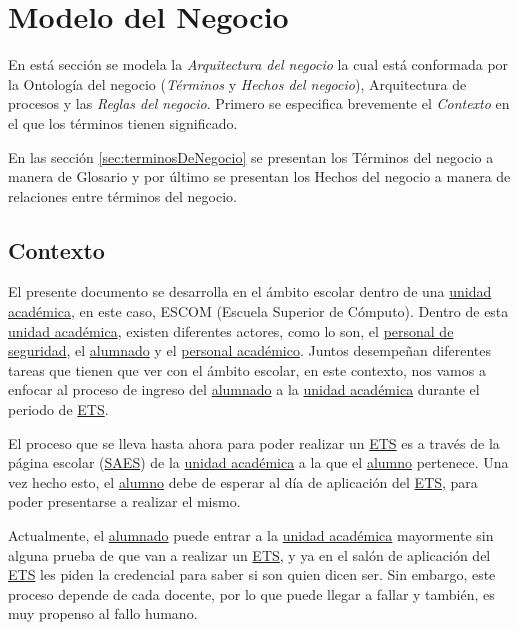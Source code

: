 \section{Modelo del Negocio}	
\label{cap:reqSist}

	En está sección se modela la {\em Arquitectura del negocio} la cual está conformada por la Ontología del negocio ({\em Términos} y {\em Hechos del negocio}), Arquitectura de procesos y las {\em Reglas del negocio}. Primero se especifica brevemente el {\em Contexto} en el que los términos tienen significado.
		
	En las sección \ref{sec:terminosDeNegocio} se presentan los Términos del negocio a manera de Glosario y por último se presentan los Hechos del negocio a manera de relaciones entre términos del negocio.


\subsection{Contexto}

	El presente documento se desarrolla en el ámbito escolar dentro de una \hyperlink{tUnidadAcademica}{unidad académica}, en este caso, ESCOM (Escuela Superior de Cómputo). Dentro de esta \hyperlink{tUnidadAcademica}{unidad académica}, existen diferentes actores, como lo son, el \hyperlink{tPersonalSeguridad}{personal de seguridad}, el \hyperlink{tAlumno}{alumnado} y el \hyperlink{tPersonalAcademico}{personal académico}. Juntos desempeñan diferentes tareas que tienen que ver con el ámbito escolar, en este contexto, nos vamos a enfocar al proceso de ingreso del \hyperlink{tAlumno}{alumnado} a la \hyperlink{tUnidadAcademica}{unidad académica} durante el periodo de \hyperlink{tETS}{ETS}.
	
	El proceso que se lleva hasta ahora para poder realizar un \hyperlink{tETS}{ETS} es a través de la página escolar (\hyperlink{tSAES}{SAES}) de la \hyperlink{tUnidadAcademica}{unidad académica} a la que el \hyperlink{tAlumno}{alumno} pertenece. Una vez hecho esto, el \hyperlink{tAlumno}{alumno} debe de esperar al día de aplicación del \hyperlink{tETS}{ETS}, para poder presentarse a realizar el mismo.
	
	Actualmente, el \hyperlink{tAlumno}{alumnado} puede entrar a la \hyperlink{tUnidadAcademica}{unidad académica} mayormente sin alguna prueba de que van a realizar un \hyperlink{tETS}{ETS}, y ya en el salón de aplicación del \hyperlink{tETS}{ETS} les piden la credencial para saber si son quien dicen ser. Sin embargo, este proceso depende de cada docente, por lo que puede llegar a fallar y también, es muy propenso al fallo humano.
	
